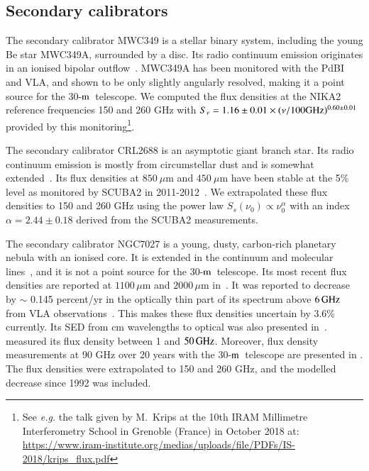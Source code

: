 \documentclass[traditionalabstract]{aa}
\newcommand{\trentemetre}{30-$\rm{m}$}
\newcommand{\lp}[1]{#1}
\begin{document}
{\begin{appendix}
\subsection{Secondary calibrators}
\label{se:ref_flux_secondaries}


The secondary calibrator MWC349 is a stellar
binary system, including the young Be star MWC349A, surrounded by a
disc. Its radio continuum emission
originates in an ionised bipolar outflow~\citep{Tafoya2004}. MWC349A has
been monitored with the PdBI and VLA, and
shown to be %
only slightly angularly resolved,
making it a point source for the \trentemetre\ telescope.
We computed the flux densities at the NIKA2 reference frequencies 150 and
260 GHz with $S_\nu = 1.16\pm0.01 \times
(\nu/100 \rm{GHz})^{0.60\pm0.01}$ provided by this
monitoring\footnote{See \emph{e.g.} the talk given by M.~Krips at the 10th 
IRAM Millimetre Interferometry School in Grenoble (France) in October
2018 at: 
\url{https://www.iram-institute.org/medias/uploads/file/PDFs/IS-2018/krips_flux.pdf}}.


The secondary calibrator CRL2688 is an asymptotic giant branch
star. Its radio continuum emission is mostly from circumstellar dust
and is somewhat extended~\citep{Knapp1994}.  Its flux densities at
$850\ \mu$m and $450 \ \mu$m have been stable at the 5\% level as
monitored by SCUBA2 in 2011-2012~\citep{Dempsey2013_SCUBA2}.
We extrapolated these flux densities to 150 and 260 GHz
using the power law $S_s(\nu_0) \propto \nu_0^{\alpha}$ with an index
$\alpha=2.44\pm0.18$ derived from the SCUBA2 measurements.


The secondary calibrator NGC7027 is a young, dusty, carbon-rich
planetary nebula with an ionised core.  It is extended in the
continuum and molecular lines~\citep{Bieging1991}, and it is not a point
source for the \trentemetre\ telescope.  Its most recent flux densities are
reported at $1100\, \mu$m and $2000\, \mu$m in~\citet{Hoare1992}. It was reported to decrease by $\sim$ 0.145 percent/yr in the optically
thin part of its spectrum above $6\,\rm{GHz}$ from VLA
observations~\citep{Zijlstra2008, Hafez2008}. This makes
these flux densities uncertain by 3.6\% currently. Its SED from cm
wavelengths to optical was also presented in~\citet{Hafez2008}. {\lp
\citet{Perley2013} measured its flux density between 1 and $50\,
\rm{GHz}$. Moreover, flux density measurements at 90 GHz over 20 years
with the \trentemetre\ telescope are presented in \citet{Kramer2008}.}
The flux densities were extrapolated to 150 and 260 GHz, and the
modelled decrease since 1992 was included.


\end{appendix}}
\end{document}

